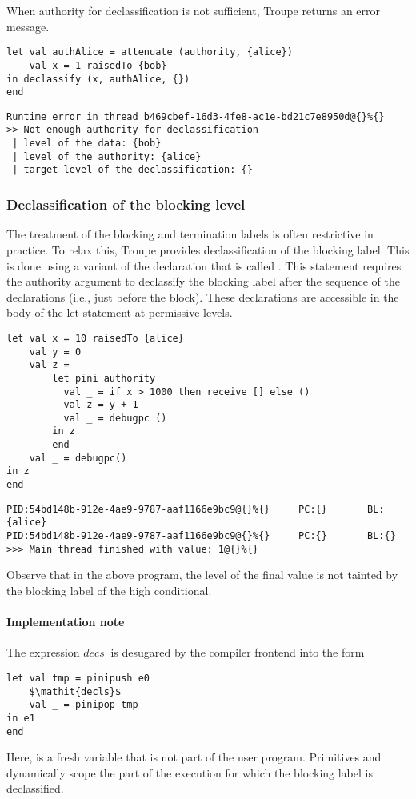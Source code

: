 When authority for declassification is not sufficient, Troupe returns an error message.
\begin{lstlisting}
let val authAlice = attenuate (authority, {alice})
    val x = 1 raisedTo {bob}
in declassify (x, authAlice, {})
end     
\end{lstlisting}

\begin{lstlisting}
Runtime error in thread b469cbef-16d3-4fe8-ac1e-bd21c7e8950d@{}%{}
>> Not enough authority for declassification
 | level of the data: {bob}
 | level of the authority: {alice}
 | target level of the declassification: {}    
\end{lstlisting}

\subsubsection{Declassification of the blocking level}
\label{sec:pinidecl}
The treatment of the blocking and termination labels is often restrictive in practice. To relax this, 
Troupe provides declassification of the blocking label. This is done using 
a variant of the  declaration that is called . 
This statement requires the authority argument to declassify the blocking label 
after the sequence of the declarations (i.e., just before the  block).
These declarations are accessible in the body of the let statement at permissive
levels.

\begin{lstlisting}
let val x = 10 raisedTo {alice}
    val y = 0
    val z = 
        let pini authority
          val _ = if x > 1000 then receive [] else ()
          val z = y + 1
          val _ = debugpc () 
        in z
        end
    val _ = debugpc()
in z
end
\end{lstlisting}

\begin{verbatim}
PID:54bd148b-912e-4ae9-9787-aaf1166e9bc9@{}%{}     PC:{}       BL:{alice}           
PID:54bd148b-912e-4ae9-9787-aaf1166e9bc9@{}%{}     PC:{}       BL:{}            
>>> Main thread finished with value: 1@{}%{}
\end{verbatim}
Observe that in the above program, the level of the final value 
is not tainted by the blocking label of the high conditional. 


\paragraph{Implementation note}
The expression  $\mathit{decs}\ $ is desugared by the compiler frontend into the form 
\begin{lstlisting}
let val tmp = pinipush e0 
    $\mathit{decls}$
    val _ = pinipop tmp
in e1      
end
\end{lstlisting}
Here,  is a fresh variable that is not part of the user program. Primitives  and 
 dynamically scope the part of the execution for which the blocking label is declassified.


